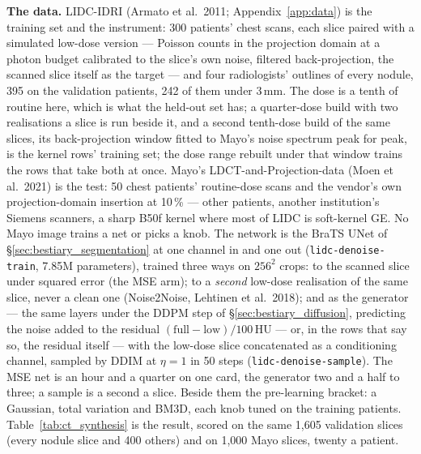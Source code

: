 \textbf{The data.} LIDC-IDRI (Armato et al.\ 2011; Appendix~\ref{app:data})
is the training set and the instrument: 300 patients' chest scans, each
slice paired with a simulated low-dose version --- Poisson counts in the
projection domain at a photon budget calibrated to the slice's own noise,
filtered back-projection, the scanned slice itself as the target --- and
four radiologists' outlines of every nodule, 395 on the validation
patients, 242 of them under 3\,mm. The dose is a tenth of routine here, which
is what the held-out set has; a quarter-dose build with two realisations a
slice is run beside it, and a second tenth-dose build of the same slices,
its back-projection window fitted to Mayo's noise spectrum peak for peak,
is the kernel rows' training set; the dose range rebuilt under that
window trains the rows that take both at once. Mayo's LDCT-and-Projection-data (Moen et al.\ 2021)
is the test: 50 chest patients' routine-dose scans and the vendor's own
projection-domain insertion at 10\,\% --- other patients, another
institution's Siemens scanners, a sharp B50f kernel where most of LIDC is
soft-kernel GE. No Mayo image trains a net or picks a knob. The network is
the BraTS UNet of \S\ref{sec:bestiary_segmentation} at one channel in and
one out (\texttt{lidc-denoise-train}, 7.85M parameters), trained three ways
on $256^2$ crops: to the scanned slice under squared error (the MSE arm);
to a \emph{second} low-dose realisation of the same slice, never a clean one
(Noise2Noise, Lehtinen et al.\ 2018); and as the generator --- the same
layers under the DDPM step of \S\ref{sec:bestiary_diffusion}, predicting the
noise added to the residual $(\mathrm{full} - \mathrm{low})/100$\,HU --- or, in
the rows that say so, the residual itself --- with the
low-dose slice concatenated as a conditioning channel, sampled by DDIM at
$\eta = 1$ in 50 steps (\texttt{lidc-denoise-sample}). The MSE net is an hour
and a quarter on one card, the generator two and a half to three; a sample
is a second a slice. Beside them the pre-learning bracket: a Gaussian, total variation and
BM3D, each knob tuned on the training patients. Table~\ref{tab:ct_synthesis}
is the result, scored on the same 1,605 validation slices (every nodule
slice and 400 others) and on 1,000 Mayo slices, twenty a patient.


